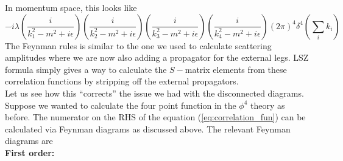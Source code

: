 \documentclass[11pt]{article}
\numberwithin{equation}{section}
\begin{document}
 In momentum space, this looks like 
\begin{equation*}
    -i\lambda \left(  \frac{i}{k_1^2 - m^2 + i\epsilon}  \right)\left(  \frac{i}{k_2^2 - m^2 + i\epsilon}  \right)\left(  \frac{i}{k_3^2 - m^2 + i\epsilon}  \right)\left(  \frac{i}{k_4^2 - m^2 + i\epsilon}  \right) (2\pi)^4 \delta^4\left(\sum_i k_i \right)
\end{equation*}
The Feynman rules is similar to the one we used to calculate scattering amplitudes where we are now also adding a propagator for the external legs. LSZ formula simply gives a way to calculate the \(S-\)matrix elements from these correlation functions by stripping off the external propagators.\\

Let us see how this ``corrects'' the issue we had with the disconnected diagrams. Suppose we wanted to calculate the four point function in the \(\phi^4\) theory as before. The numerator on the RHS of the equation (\ref{eq:correlation_fun}) can be calculated via Feynman diagrams as discussed above. The relevant Feynman diagrams are \\

\textbf{First order: }
\begin{figure}[h]
    \centering
\end{figure}
\end{document}
